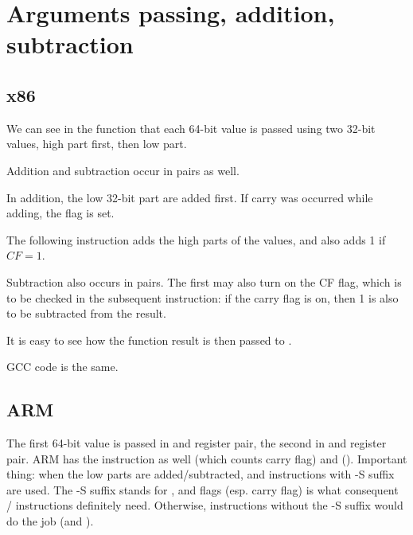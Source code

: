 ﻿\section{Arguments passing, addition, subtraction}



\subsection{x86}



We can see in the  function that each 64-bit value is passed using two 32-bit values,
high part first, then low part. 

Addition and subtraction occur in pairs as well.

In addition, the low 32-bit part are added first.
If carry was occurred while adding, the  flag is set.

The following  instruction adds the high parts of the values, and also adds 1 if $CF=1$.

Subtraction also occurs in pairs.
The first \SUB may also turn on the CF flag, which is to be checked in the subsequent  instruction:
if the carry flag is on, then 1 is also to be subtracted from the result.

It is easy to see how the  function result is then passed to \printf{}.

\ifdefined\IncludeGCC


GCC code is the same.
\fi

\ifdefined\IncludeARM
\subsection{ARM}




The first 64-bit value is passed in  and  register pair, the second in  and  register pair.
ARM has the  instruction as well (which counts carry flag) and  ().
Important thing: when the low parts are added/subtracted,  and  instructions with -S suffix are used.
The -S suffix stands for , and flags (esp. carry flag) is what consequent / instructions definitely need.
Otherwise, instructions without the -S suffix would do the job (\ADD and \SUB).

